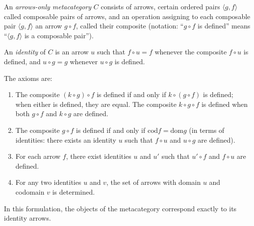 An \emph{arrows-only metacategory} $C$ consists of arrows, certain ordered pairs $\langle g, f \rangle$ called composable pairs of arrows, and an operation assigning to each composable pair $\langle g, f \rangle$ an arrow $g \circ f$, called their composite (notation: ``$g \circ f$ is defined'' means ``$\langle g, f \rangle$ is a composable pair'').

An \emph{identity} of $C$ is an arrow $u$ such that $f \circ u = f$ whenever the composite $f \circ u$ is defined, and $u \circ g = g$ whenever $u \circ g$ is defined.

The axioms are:
\begin{enumerate}
\item The composite $(k \circ g) \circ f$ is defined if and only if $k \circ (g \circ f)$ is defined; when either is defined, they are equal. The composite $k \circ g \circ f$ is defined when both $g \circ f$ and $k \circ g$ are defined.
\item The composite $g \circ f$ is defined if and only if $\text{cod} f = \text{dom} g$ (in terms of identities: there exists an identity $u$ such that $f \circ u$ and $u \circ g$ are defined).
\item For each arrow $f$, there exist identities $u$ and $u'$ such that $u' \circ f$ and $f \circ u$ are defined.
\item For any two identities $u$ and $v$, the set of arrows with domain $u$ and codomain $v$ is determined.
\end{enumerate}

In this formulation, the objects of the metacategory correspond exactly to its identity arrows.
